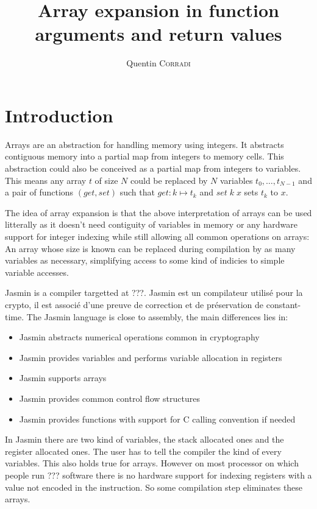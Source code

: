 \documentclass{article}
\title{Array expansion in function arguments and return values}
\author{Quentin \textsc{Corradi}}
\begin{document}
\maketitle

\section{Introduction}

Arrays are an abstraction for handling memory using integers. It abstracts
contiguous memory into a partial map from integers to memory cells. This
abstraction could also be conceived as a partial map from integers to variables.
This means any array \(t\) of size \(N\) could be replaced by \(N\) variables
\(t_0, \dots, t_{N - 1}\) and a pair of functions
\((\mathit{get}, \mathit{set})\) such that \(\mathit{get} : k \mapsto t_k\) and
\(\mathit{set}\;k\;x\) sets \(t_k\) to \(x\).

\smallskip

The idea of array expansion is that the above interpretation of arrays can be
used litterally as it doesn't need contiguity of variables in memory or any
hardware support for integer indexing while still allowing all common operations
on arrays: An array whose size is known can be replaced during compilation by as
many variables as necessary, simplifying access to some kind of indicies to
simple variable accesses.

\smallskip

Jasmin is a compiler targetted at ???.
 Jasmin est un compilateur utilisé pour la crypto, il est associé d'une preuve
 de correction et de préservation de constant-time.
The Jasmin language is close to assembly, the main differences lies in:
\begin{itemize}
\item Jasmin abstracts numerical operations common in cryptography
\item Jasmin provides variables and performs variable allocation in registers
\item Jasmin supports arrays
\item Jasmin provides common control flow structures
\item Jasmin provides functions with support for C calling convention if needed
\end{itemize}\smallskip

In Jasmin there are two kind of variables, the stack allocated ones and the
register allocated ones. The user has to tell the compiler the kind of every
variables. This also holds true for arrays. However on most processor on which
people run ??? software there is no hardware support for indexing registers with
a value not encoded in the instruction. So some compilation step eliminates
these arrays.
\end{document}
